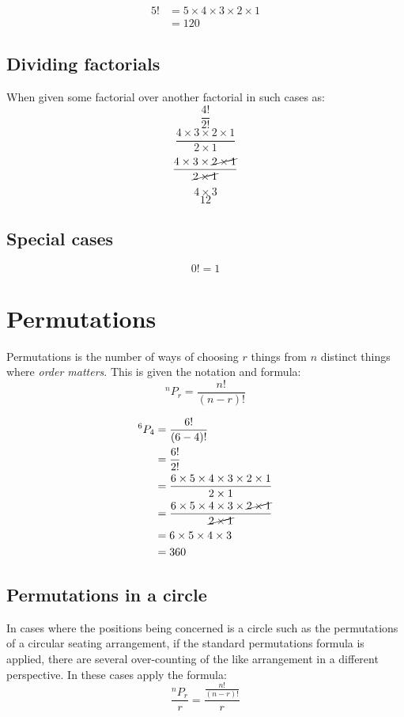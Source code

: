 \documentclass{book}
\newcommand{\Perm}[2]{{}^#1P_{#2}}
\begin{document}
\begin{align*}
	5! & = 5 \times 4 \times 3 \times 2 \times 1 \\
	   & = 120
\end{align*}


\section{Dividing factorials}
When given some factorial over another factorial in such cases as:
\[
	\frac{4!}{2!}
\]
\[
	\frac{4 \times 3 \times 2 \times 1}{2 \times 1}
\]
\[
	\frac{4 \times 3 \times \cancel{2 \times 1}}{\cancel{2 \times 1}}
\]
\[
	4 \times 3
\]
\[
	12
\]

\section{Special cases}
\[
	0! = 1
\]

\chapter{Permutations}
Permutations is the number of ways of choosing $r$ things from $n$ distinct things where \emph{order matters}.  This is given the notation and formula:
\[
	^nP_r = \frac{n!}{(n-r)!}
\]

\begin{align*}
	\Perm{6}{4} & = \frac{6!}{(6 - 4)!}                                                                 \\
	            & = \frac{6!}{2!}                                                                       \\
	            & = \frac{6 \times 5 \times 4 \times 3 \times 2 \times 1}{2 \times 1}                   \\
	            & = \frac{6 \times 5 \times 4 \times 3 \times \cancel{2 \times 1}}{\cancel{2 \times 1}} \\
	            & = 6 \times 5 \times 4 \times 3                                                        \\
	            & = 360
\end{align*}


\section{Permutations in a circle}
In cases where the positions being concerned is a circle such as the permutations of a circular seating arrangement, if the standard permutations formula is applied, there are several over-counting of the like arrangement in a different perspective.  In these cases apply the formula:
\[
	\frac{^nP_r}{r} = \frac{\frac{n!}{(n-r)!}}{r}
\]
\end{document}
